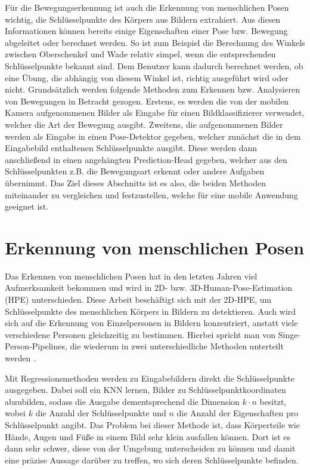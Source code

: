 Für die Bewegungserkennung ist auch die Erkennung von menschlichen Posen
wichtig, die Schlüsselpunkte des Körpers aus Bildern extrahiert. Aus diesen
Informationen können bereits einige Eigenschaften einer Pose bzw. Bewegung
abgeleitet oder berechnet werden. So ist zum Beispiel die Berechnung des Winkels
zwischen Oberschenkel und Wade relativ simpel, wenn die entsprechenden
Schlüsselpunkte bekannt sind. Dem Benutzer kann dadurch berechnet werden, ob
eine Übung, die abhängig von diesem Winkel ist, richtig ausgeführt wird oder
nicht. Grundsätzlich werden folgende Methoden zum Erkennen bzw. Analysieren von
Bewegungen in Betracht gezogen. Erstens, es werden die von der mobilen Kamera
aufgenommenen Bilder als Eingabe für einen Bildklassifizierer verwendet, welcher
die Art der Bewegung ausgibt. Zweitens, die aufgenommenen Bilder werden als
Eingabe in einen Pose-Detektor gegeben, welcher zunächst die in dem Eingabebild
enthaltenen Schlüsselpunkte ausgibt. Diese werden dann anschließend in einen
angehängten Prediction-Head gegeben, welcher aus den Schlüsselpunkten z.B. die
Bewegungsart erkennt oder andere Aufgaben übernimmt. Das Ziel dieses Abschnitts
ist es also, die beiden Methoden miteinander zu vergleichen und festzustellen,
welche für eine mobile Anwendung geeignet ist.

\section{Erkennung von menschlichen Posen}
Das Erkennen von menschlichen Posen hat in den letzten Jahren viel
Aufmerksamkeit bekommen und wird in 2D- bzw. 3D-Human-Pose-Estimation (HPE)
unterschieden. Diese Arbeit beschäftigt sich mit der 2D-HPE, um Schlüsselpunkte
des menschlichen Körpers in Bildern zu detektieren. Auch wird sich auf die
Erkennung von Einzelpersonen in Bildern konzentriert, anstatt viele verschiedene
Personen gleichzeitig zu bestimmen. Hierbei spricht man von
Singe-Person-Pipelines, die wiederum in zwei unterschiedliche Methoden
unterteilt werden \cite{zheng2021deep}.

Mit Regressionsmethoden werden zu Eingabebildern direkt die Schlüsselpunkte
ausgegeben. Dabei soll ein KNN lernen, Bilder zu Schlüsselpunktkoordinaten
abzubilden, sodass die Ausgabe dementsprechend die Dimension $k \cdot n$
besitzt, wobei $k$ die Anzahl der Schlüsselpunkte und $n$ die Anzahl der
Eigenschaften pro Schlüsselpunkt angibt. Das Problem bei dieser Methode ist,
dass Körperteile wie Hände, Augen und Füße in einem Bild sehr klein ausfallen
können. Dort ist es dann sehr schwer, diese von der Umgebung unterscheiden zu
können und damit eine präzise Aussage darüber zu treffen, wo sich deren
Schlüsselpunkte befinden.

